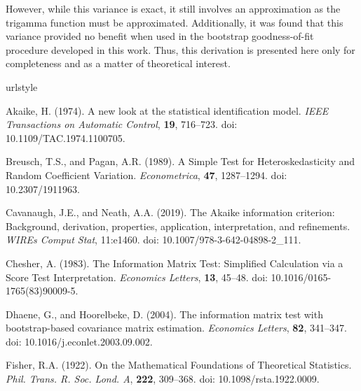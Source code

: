\documentclass[sn-mathphys-ay]{sn-jnl}
\begin{document}
However, while this variance is exact, it still involves an approximation as the trigamma function must be approximated. Additionally, it was found that
this variance provided no benefit when used in the bootstrap goodness-of-fit procedure developed in this work. Thus, this derivation is presented here only
for completeness and as a matter of theoretical interest.



%


\begin{thebibliography}{99}
\providecommand{\natexlab}[1]{#1}
\providecommand{\url}[1]{\texttt{#1}}
\expandafter\ifx\csname urlstyle\endcsname\relax
  \providecommand{\doi}[1]{doi: #1}\else
  \providecommand{\doi}{doi: \begingroup \urlstyle{rm}\Url}\fi

{\rm Akaike, H.} (1974).
\newblock A new look at the statistical identification model.
\newblock \emph{IEEE Transactions on Automatic Control}, {\bf 19},  716--723.
\newblock \doi{10.1109/TAC.1974.1100705}.

{\rm Breusch, T.S., and Pagan, A.R.} (1989).
\newblock A Simple Test for Heteroskedasticity and Random Coefficient Variation.
\newblock \emph{Econometrica}, {\bf 47},  1287--1294.
\newblock \doi{10.2307/1911963}.

{\rm Cavanaugh, J.E., and Neath, A.A.} (2019).
\newblock The Akaike information criterion: Background, derivation, properties, application, interpretation, and refinements.
\newblock \emph{WIREs Comput Stat}, 11:e1460.
\newblock \doi{10.1007/978-3-642-04898-2_111}.

{\rm Chesher, A.} (1983).
\newblock The Information Matrix Test: Simplified Calculation via a Score Test Interpretation.
\newblock \emph{Economics Letters}, {\bf 13},  45--48.
\newblock \doi{10.1016/0165-1765(83)90009-5}.

{\rm Dhaene, G., and Hoorelbeke, D.} (2004).
\newblock The information matrix test with bootstrap-based covariance matrix estimation.
\newblock \emph{Economics Letters}, {\bf 82},  341--347.
\newblock \doi{10.1016/j.econlet.2003.09.002}.

{\rm Fisher, R.A.} (1922).
\newblock On the Mathematical Foundations of Theoretical Statistics.
\newblock \emph{Phil. Trans. R. Soc. Lond. A}, {\bf 222},  309--368.
\newblock \doi{10.1098/rsta.1922.0009}.


\end{thebibliography}
\end{document}
